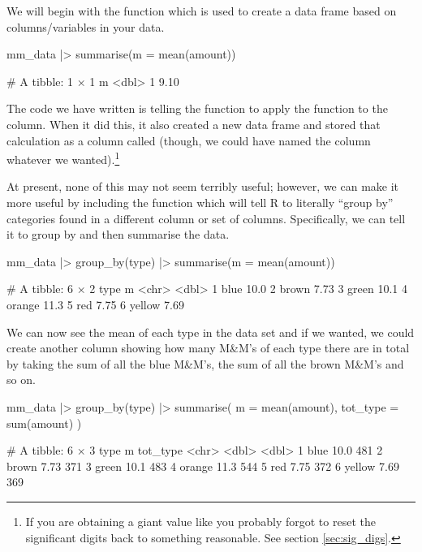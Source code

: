 We will begin with the  function which is used to create a data frame based on columns/variables in your data.

\begin{inR}
mm_data |> 
  summarise(m = mean(amount))
\end{inR}

\begin{outR}
# A tibble: 1 × 1
      m
  <dbl>
1  9.10
\end{outR}

The code we have written is telling the  function to apply the  function to the  column. When it did this, it also created a new data frame and stored that calculation as a column called  (though, we could have named the column whatever we wanted).\footnote{If you are obtaining a giant value like  you probably forgot to reset the significant digits back to something reasonable. See section \ref{sec:sig_digs}.}

At present, none of this may not seem terribly useful; however, we can make it more useful by including the  function which will tell R to literally ``group by'' categories found in a different column or set of columns. Specifically, we can tell it to group by  and then summarise the data.

\begin{inR}
mm_data |> 
  group_by(type) |>
  summarise(m = mean(amount))
\end{inR}
\begin{outR}
# A tibble: 6 × 2
  type       m
  <chr>  <dbl>
1 blue   10.0 
2 brown   7.73
3 green  10.1 
4 orange 11.3 
5 red     7.75
6 yellow  7.69
\end{outR}

We can now see the mean of each type in the data set and if we wanted, we could create another column showing how many M\&M's of each type there are in total by taking the sum of all the blue M\&M's, the sum of all the brown M\&M's and so on.

\begin{inR}
mm_data |>
  group_by(type) |>
  summarise(
    m = mean(amount),
    tot_type = sum(amount)
  )
\end{inR}
\begin{outR}
# A tibble: 6 × 3
  type       m tot_type
  <chr>  <dbl>    <dbl>
1 blue   10.0       481
2 brown   7.73      371
3 green  10.1       483
4 orange 11.3       544
5 red     7.75      372
6 yellow  7.69      369
\end{outR}

